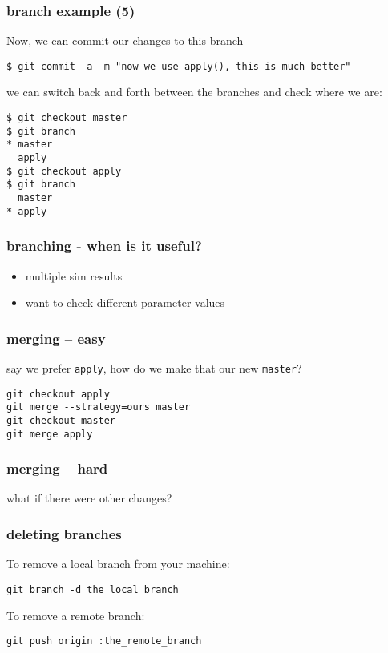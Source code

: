\documentclass[ignorenonframetext,]{beamer}
\begin{document}
\begin{frame}[fragile]\frametitle{branch example (5)}

Now, we can commit our changes to this branch

\begin{verbatim}
$ git commit -a -m "now we use apply(), this is much better"
\end{verbatim}

we can switch back and forth between the branches and check where we
are:

\begin{verbatim}
$ git checkout master
$ git branch
* master
  apply
$ git checkout apply
$ git branch
  master
* apply
\end{verbatim}

\end{frame}

\begin{frame}\frametitle{branching - when is it useful?}

\begin{itemize}[<+->]
\item
  multiple sim results
\item
  want to check different parameter values
\end{itemize}

\end{frame}

\begin{frame}[fragile]\frametitle{merging -- easy}

say we prefer \texttt{apply}, how do we make that our new
\texttt{master}?

\begin{verbatim}
git checkout apply
git merge --strategy=ours master
git checkout master
git merge apply
\end{verbatim}

\end{frame}

\begin{frame}\frametitle{merging -- hard}

what if there were other changes?

\end{frame}

\begin{frame}[fragile]\frametitle{deleting branches}

To remove a local branch from your machine:

\begin{verbatim}
git branch -d the_local_branch
\end{verbatim}

To remove a remote branch:

\begin{verbatim}
git push origin :the_remote_branch
\end{verbatim}

\end{frame}
\end{document}
